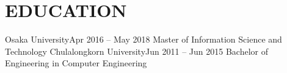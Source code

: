 \section {EDUCATION}
  \resumeSubHeadingListStart
    \resumeSubheading
      {Osaka University}{Apr 2016 -- May 2018}
      {Master of Information Science and Technology}{}
      	\resumeItemListStart
        \resumeItemListEnd
    \vspace{-5pt}
    \resumeSubheading
      {Chulalongkorn University}{Jun 2011 -- Jun 2015}
      {Bachelor of Engineering in Computer Engineering}{}
      	\resumeItemListStart
        \resumeItemListEnd        
  \resumeSubHeadingListEnd
